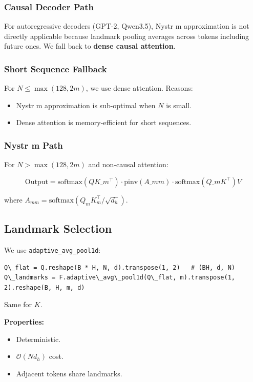 \subsubsection{Causal Decoder Path}

For autoregressive decoders (GPT-2, Qwen3.5), Nystr m approximation is 
not directly applicable because landmark pooling averages across tokens 
including future ones. We fall back to \textbf{dense causal attention}.

\subsubsection{Short Sequence Fallback}

For $N \leq \max(128, 2m)$, we use dense attention. Reasons:

\begin{itemize}
\item Nystr m approximation is sub-optimal when $N$ is small.
\item Dense attention is memory-efficient for short sequences.

\end{itemize}
\subsubsection{Nystr m Path}

For $N > \max(128, 2m)$ and non-causal attention:

\[
\text{Output} = \text{softmax}(Q K\_m^\top) \cdot \text{pinv}(A\_{mm}) \cdot \text{softmax}(Q\_m K^\top) V
\tag{4.1}
\]

where $A_{mm} = \text{softmax}(Q_m K_m^\top / \sqrt{d_h})$.

\subsection{Landmark Selection}

We use \texttt{adaptive\_avg\_pool1d}:

\begin{lstlisting}
Q\_flat = Q.reshape(B * H, N, d).transpose(1, 2)   # (BH, d, N)
Q\_landmarks = F.adaptive\_avg\_pool1d(Q\_flat, m).transpose(1, 2).reshape(B, H, m, d)
\end{lstlisting}

Same for $K$.

\textbf{Properties:}
\begin{itemize}
\item Deterministic.
\item $\mathcal{O}(N d_h)$ cost.
\item Adjacent tokens share landmarks.

\end{itemize}
